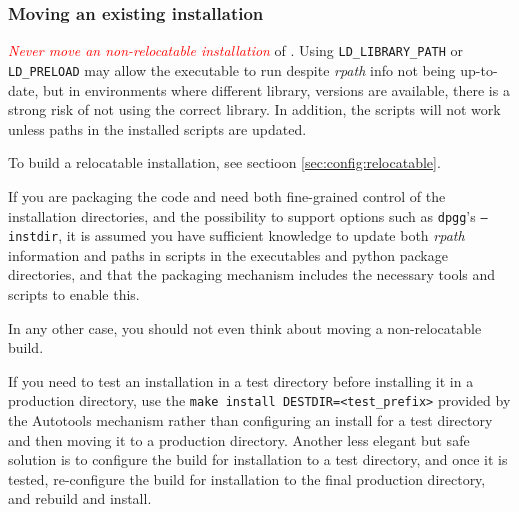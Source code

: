 \documentclass[a4paper,10pt,twoside]{csshortdoc}
\begin{document}
\subsubsection{Moving an existing installation}

\textcolor{Red}{\emph{Never move an non-relocatable installation}} of \CS.
Using \texttt{LD\_LIBRARY\_PATH} or \texttt{LD\_PRELOAD}
may allow the executable to run despite \emph{rpath} info
not being up-to-date, but in environments where different library,
versions are available, there is a strong risk of not using
the correct library. In addition, the scripts will not work
unless paths in the installed scripts are updated.

To build a relocatable installation, see sectioon
\ref{sec:config:relocatable}.

If you are packaging the code and need both fine-grained control of
the installation directories, and the possibility to support
options such as \texttt{dpgg}'s \texttt{--instdir}, it is assumed
you have sufficient knowledge to update both \emph{rpath} information
and paths in scripts in the executables and python package directories,
and that the packaging mechanism includes the necessary tools and
scripts to enable this.

In any other case, you should not even think about moving a
non-relocatable build.

If you need to test an installation in a test directory before
installing it in a production directory, use the
\texttt{make install DESTDIR=<test\_prefix>} provided
by the Autotools mechanism rather than configuring an install for a
test directory and then moving it to a production directory.
Another less elegant but safe solution is to configure the build for
installation to a test directory, and once it is tested,
re-configure the build for installation to the final production
directory, and rebuild and install.
\end{document}
